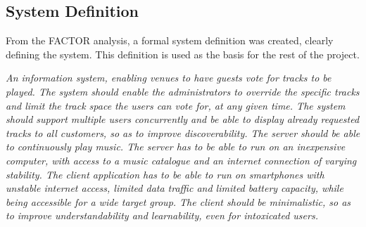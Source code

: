\subsection{System Definition}\label{sub:systemDefinition}
From the FACTOR analysis, a formal system definition was created,
clearly defining the system. This definition is used as the basis for
the rest of the project.

\begin{center}
\textit{An information system, enabling venues to have guests vote for tracks to be played. The system should enable the administrators to override the specific tracks and limit the track space the users can vote for, at any given time. The system should support multiple users concurrently and be able to display already requested tracks to all customers, so as to improve discoverability. The server should be able to continuously play music. The server has to be able to run on an inexpensive computer, with access to a music catalogue and an internet connection of varying stability. The client application has to be able to run on smartphones with unstable internet access, limited data traffic and limited battery capacity, while being accessible for a wide target group. The client should be minimalistic, so as to improve understandability and learnability, even for intoxicated users.}
\end{center}
